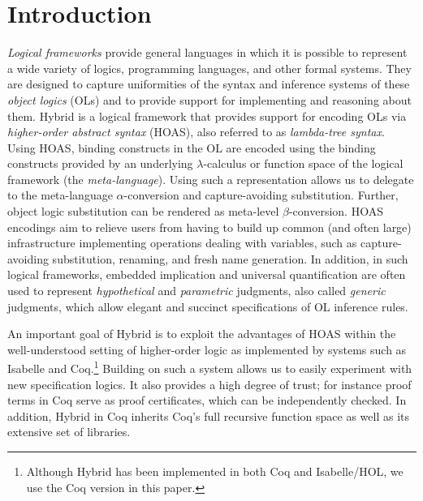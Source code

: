 \section{Introduction}

\emph{Logical frameworks} provide general languages in which it is possible to represent a wide variety of logics, programming languages,
and other formal systems.  They are designed to capture uniformities of the syntax and inference systems of these \emph{object logics} (OLs) and to provide support for implementing and reasoning about them.  Hybrid \cite{FeltyMomigliano:JAR10} is a logical framework that provides support for encoding OLs via \emph{higher-order abstract   syntax} (HOAS), also referred to as \emph{lambda-tree syntax}.
Using HOAS, binding constructs in the OL are encoded using the binding constructs provided by an underlying $\lambda$-calculus or function space of the logical framework (the \emph{meta-language}).  Using such a representation allows us to delegate to the meta-language $\alpha$-conversion and capture-avoiding substitution.  Further, object logic substitution can be rendered as meta-level $\beta$-conversion.  HOAS encodings aim to relieve users from having to build up common (and often large) infrastructure implementing operations dealing with variables, such as capture-avoiding substitution, renaming, and fresh name generation.  In addition, in such logical frameworks, embedded implication and universal quantification are often used to represent \emph{hypothetical} and \emph{parametric} judgments, also called \emph{generic} judgments, %
which allow elegant and succinct specifications of OL inference rules.

An important goal of Hybrid is to exploit the advantages of HOAS within the well-understood setting of higher-order logic as implemented by systems such as Isabelle and Coq.\footnote{Although Hybrid has been implemented in both Coq and Isabelle/HOL, we use the Coq version in this paper.}  Building on such a system allows us to easily experiment with new specification logics.  It also provides a high degree of trust; for instance proof terms in Coq serve as proof certificates, which can be independently checked.  In addition, Hybrid in Coq inherits Coq's full recursive function space as well as its extensive set of libraries.

